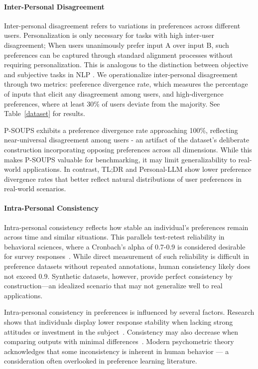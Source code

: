 \paragraph{Inter-Personal Disagreement} 
Inter-personal disagreement refers to variations in preferences across different users. Personalization is only necessary for tasks with high inter-user disagreement; When users unanimously prefer input A over input B, such preferences can be captured through standard alignment processes without requiring personalization. This is analogous to the distinction between objective and subjective tasks in NLP \cite{ovesdotter-alm-2011-subjective,plank-2022-problem}. %
We operationalize inter-personal disagreement through two metrics: preference divergence rate, which measures the percentage of inputs that elicit any disagreement among users, and high-divergence preferences, where at least 30\% of users deviate from the majority. See Table~\ref{dataset} for results.



P-SOUPS exhibits a preference divergence rate approaching 100\%, reflecting near-universal disagreement among users - an artifact of the dataset's deliberate construction incorporating opposing preferences across all dimensions. While this makes P-SOUPS valuable for benchmarking, it may limit generalizability to real-world applications. In contrast, TL;DR and Personal-LLM show lower preference divergence rates that better reflect natural distributions of user preferences in real-world scenarios.

\paragraph{Intra-Personal Consistency} 
Intra-personal consistency reflects how stable an individual's preferences remain across time and similar situations. This parallels test-retest reliability in behavioral sciences, where a Cronbach's alpha of 0.7-0.9 is considered desirable for survey responses~\cite{nunnally1994psychometric}. While direct measurement of such reliability is difficult in preference datasets without repeated annotations, human consistency likely does not exceed 0.9. Synthetic datasets, however, provide perfect consistency by construction—an idealized scenario that may not generalize well to real applications.

Intra-personal consistency in preferences is influenced by several factors. Research shows that individuals display lower response stability when lacking strong attitudes or investment in the subject~\citep{Converse01012006, Achen_1975}. Consistency may also decrease when comparing outputs with minimal differences~\cite{padmakumar2024beyond}. Modern psychometric theory acknowledges that some inconsistency is inherent in human behavior — a consideration often overlooked in preference learning literature.






